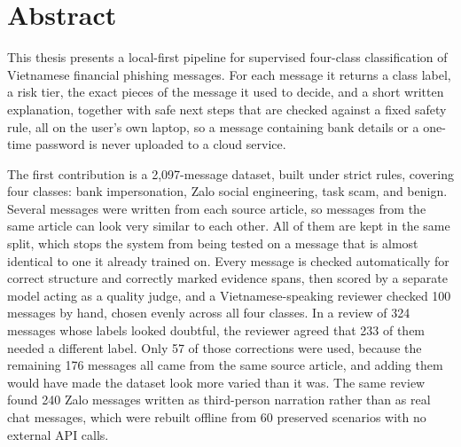 \clearpage
\chapter*{\listfigurename}
{\singlespacing
\makeatletter{}\makeatother
}

\clearpage
\chapter*{Abstract}
This thesis presents a local-first pipeline for supervised four-class classification of Vietnamese financial phishing messages. For each message it returns a class label, a risk tier, the exact pieces of the message it used to decide, and a short written explanation, together with safe next steps that are checked against a fixed safety rule, all on the user's own laptop, so a message containing bank details or a one-time password is never uploaded to a cloud service.

The first contribution is a 2{,}097-message dataset, built under strict rules, covering four classes: bank impersonation, Zalo social engineering, task scam, and benign. Several messages were written from each source article, so messages from the same article can look very similar to each other. All of them are kept in the same split, which stops the system from being tested on a message that is almost identical to one it already trained on. Every message is checked automatically for correct structure and correctly marked evidence spans, then scored by a separate model acting as a quality judge, and a Vietnamese-speaking reviewer checked 100 messages by hand, chosen evenly across all four classes. In a review of 324 messages whose labels looked doubtful, the reviewer agreed that 233 of them needed a different label. Only 57 of those corrections were used, because the remaining 176 messages all came from the same source article, and adding them would have made the dataset look more varied than it was. The same review found 240 Zalo messages written as third-person narration rather than as real chat messages, which were rebuilt offline from 60 preserved scenarios with no external API calls.


